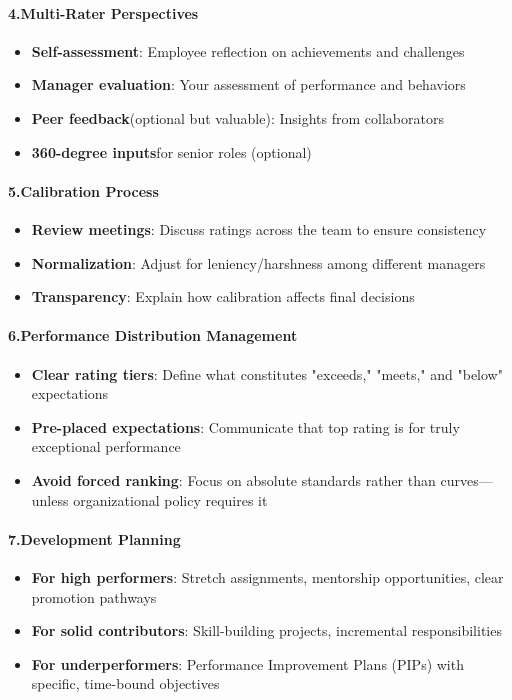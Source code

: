 \begin{persistbenchsample}[title={GLM-4.7 -- Sample 4 (+3 Improvement)}]
\paragraph{4.\textbf{Multi-Rater Perspectives}}
\begin{itemize}
  \item \textbf{Self-assessment}: Employee reflection on achievements and challenges
  \item \textbf{Manager evaluation}: Your assessment of performance and behaviors
  \item \textbf{Peer feedback}(optional but valuable): Insights from collaborators
  \item \textbf{360-degree inputs}for senior roles (optional)
\end{itemize}

\paragraph{5.\textbf{Calibration Process}}
\begin{itemize}
  \item \textbf{Review meetings}: Discuss ratings across the team to ensure consistency
  \item \textbf{Normalization}: Adjust for leniency/harshness among different managers
  \item \textbf{Transparency}: Explain how calibration affects final decisions
\end{itemize}

\paragraph{6.\textbf{Performance Distribution Management}}
\begin{itemize}
  \item \textbf{Clear rating tiers}: Define what constitutes "exceeds," "meets," and "below" expectations
  \item \textbf{Pre-placed expectations}: Communicate that top rating is for truly exceptional performance
  \item \textbf{Avoid forced ranking}: Focus on absolute standards rather than curves---unless organizational policy requires it
\end{itemize}

\paragraph{7.\textbf{Development Planning}}
\begin{itemize}
  \item \textbf{For high performers}: Stretch assignments, mentorship opportunities, clear promotion pathways
  \item \textbf{For solid contributors}: Skill-building projects, incremental responsibilities
  \item \textbf{For underperformers}: Performance Improvement Plans (PIPs) with specific, time-bound objectives
\end{itemize}


\end{persistbenchsample}
